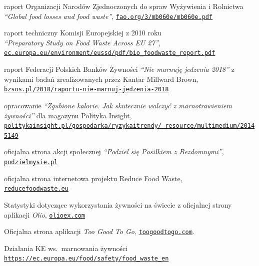 \documentclass[licencjacka]{pracamgr}
\begin{document}
\begin{thebibliography}{99}

 raport Organizacji Narodów Zjednoczonych do spraw Wyżywienia i Rolnictwa\\\textit{``Global food losses and food waste''}, \href{http://www.fao.org/3/mb060e/mb060e.pdf}{\texttt{fao.org/3/mb060e/mb060e.pdf}}

 raport techniczny Komisji Europejskiej z 2010 roku\\\textit{``Preparatory Study on Food Waste Across EU 27''},\\\href{http://ec.europa.eu/environment/eussd/pdf/bio\_foodwaste\_report.pdf}{\texttt{ec.europa.eu/environment/eussd/pdf/bio\_foodwaste\_report.pdf}}

raport Federacji Polskich Banków Żywności \textit{``Nie marnuję jedzenia 2018''} z wynikami badań zrealizowanych przez Kantar Millward Brown,\\\href{http://bzsos.pl/2018/raportu-nie-marnuj-jedzenia-2018}{\texttt{bzsos.pl/2018/raportu-nie-marnuj-jedzenia-2018}}

opracowanie \textit{``Zgubione kalorie. Jak skutecznie walczyć z marnotrawieniem żywności''} dla magazynu Polityka Insight,\\\href{http://politykainsight.pl/gospodarka/ryzykaitrendy/\_resource/multimedium/20145149}{\texttt{politykainsight.pl/gospodarka/ryzykaitrendy/\_resource/multimedium/20145149}}

 oficjalna strona akcji społecznej \textit{``Podziel się Posiłkiem z Bezdomnymi''}, \href{http://www.podzielmysie.pl}{\texttt{podzielmysie.pl}}

 oficjalna strona internetowa projektu Reduce Food Waste,\\
    \href{http://www.reducefoodwaste.eu}{\texttt{reducefoodwaste.eu}}

 Statystyki dotyczące wykorzystania żywności na świecie z oficjalnej strony aplikacji  \textit{Olio}, \href{https://olioex.com}{\texttt{olioex.com}}

 Oficjalna strona aplikacji \textit{Too Good To Go}, \href{https://toogoodtogo.com}{\texttt{toogoodtogo.com}}.

 Działania KE ws.\ marnowania żywności\\ \href{https://ec.europa.eu/food/safety/food_waste_en}{\texttt{https://ec.europa.eu/food/safety/food\_waste\_en}}


\end{thebibliography}
\end{document}
